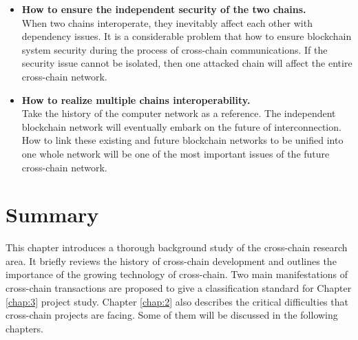 \begin{itemize}
    \item \textbf{How to ensure the independent security of the two chains.} \\
    When two chains interoperate, they inevitably affect each other with dependency issues. It is a considerable problem that how to ensure blockchain system security during the process of cross-chain communications. If the security issue cannot be isolated, then one attacked chain will affect the entire cross-chain network.
    \item \textbf{How to realize multiple chains interoperability.} \\
    Take the history of the computer network as a reference. The independent blockchain network will eventually embark on the future of interconnection. How to link these existing and future blockchain networks to be unified into one whole network will be one of the most important issues of the future cross-chain network. 
\end{itemize}

\section{Summary}

\noindent This chapter introduces a thorough background study of the cross-chain research area. It briefly reviews the history of cross-chain development and outlines the importance of the growing technology of cross-chain. Two main manifestations of cross-chain transactions are proposed to give a classification standard for Chapter \ref{chap:3} project study. Chapter \ref{chap:2} also describes the critical difficulties that cross-chain projects are facing. Some of them will be discussed in the following chapters.